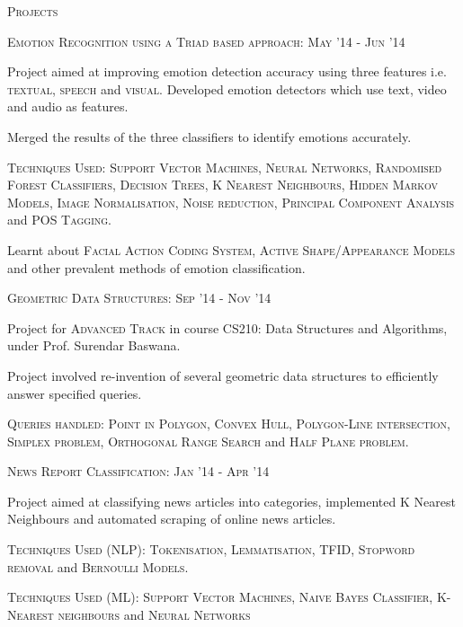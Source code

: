 \documentclass[10pt]{article}
\begin{document}
	\vspace{3mm}

	{\centering\Large{\textsc{Projects}} \hrulefill}
		
	\vspace{3mm}
	
	\large{\textsc{Emotion Recognition using a Triad based approach:}}   \hfill \small\textsc{May '14 - Jun '14}
	\begin{itemize}
	\small
	{
	\item Project aimed at improving emotion detection accuracy using three features i.e. \textsc{textual, speech} and \textsc{visual}. Developed emotion detectors which use text, video and audio as features.
	\item Merged the results of the three classifiers to identify emotions accurately.
	\item \textsc{Techniques Used:} \textsc{Support Vector Machines, Neural Networks, Randomised Forest Classifiers, Decision Trees, K Nearest Neighbours, Hidden Markov Models, Image Normalisation, Noise reduction, Principal Component Analysis} and \textsc{POS Tagging}.
	\item Learnt about \textsc{Facial Action Coding System,
Active Shape/Appearance Models} and other prevalent methods of emotion classification.
	}
	\end{itemize}
		
	\vspace{1mm}
	
	\large{\textsc{Geometric Data Structures:}}   \hfill \small\textsc{Sep '14 - Nov '14}
	\begin{itemize}
	\small
	{
	\item Project for \textsc{Advanced Track} in course CS210: Data Structures and Algorithms, under Prof. Surendar Baswana.
	\item Project involved re-invention of several geometric data structures to efficiently answer specified queries.	
	\item \textsc{Queries handled:} \textsc{Point in Polygon, Convex Hull, Polygon-Line intersection, Simplex problem, Orthogonal Range Search} and \textsc{Half Plane problem}.
	}
	\end{itemize}
 		
	\vspace{1mm}
		
	\large{\textsc{News Report Classification:}}   \hfill \small\textsc{Jan '14 - Apr '14}
	\begin{itemize}
	\small
	{
	\item Project aimed at classifying news articles into categories, implemented K Nearest Neighbours and automated scraping of online news articles.
	\item \textsc{Techniques Used (NLP):} \textsc{Tokenisation, Lemmatisation, TFID, Stopword removal} and \textsc{Bernoulli Models}.
	\item \textsc{Techniques Used (ML):} \textsc{Support Vector Machines, Naive Bayes Classifier, K-Nearest neighbours} and \textsc{Neural Networks}
	}
	\end{itemize}
 		
\end{document}
